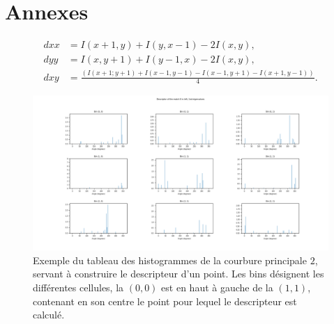 \documentclass[
	a4paper, %
	10pt, %
	unnumberedsections, %
	twoside, %
]{LTJournalArticle}
\begin{document}
\clearpage

\section{Annexes}

\begin{equation} \label{eq:hess_coefs}
	\begin{split}
		dxx & = I(x+1, y) + I(y, x-1) - 2I(x, y),                                              \\
		dyy & = I(x, y+1) + I(y-1, x) - 2I(x, y),                                              \\
		dxy & = \frac{\left(I(x+1; y+1) + I(x-1, y-1) - I(x-1, y+1) - I(x+1, y-1) \right)}{4}.
	\end{split}
\end{equation}

\begin{figure}[H]
	\centering
	\includegraphics[width=\textwidth]{images/histo_result.png}
	\caption{Exemple du tableau des histogrammes de la courbure principale $2$,
		servant à construire le descripteur d'un point. Les bins désignent les différentes
		cellules, la $(0,0)$ est en haut à gauche de la $(1,1)$, contenant en son
		centre le point pour lequel le descripteur est calculé.}
	\label{figure:fig_hist}
\end{figure}
\end{document}
